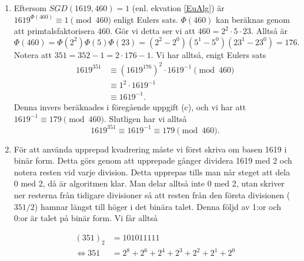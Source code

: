 \documentclass{article}
\begin{document}
\begin{enumerate}[label=(\alph*)]
	\item
	Eftersom $SGD(1619, 460) = 1$ (enl. ekvation \ref{EuAlg}) är $1619^{\Phi(460)} \equiv 1 \pmod{460}$ enligt Eulers sats. $\Phi(460)$ kan beräknas genom att primtalsfaktorisera 460. Gör vi detta ser vi att $460 = 2^2 \cdot 5 \cdot 23$. Alltså är
	\[
		\Phi(460) = \Phi(2^2) \Phi(5) \Phi(23) = (2^{2} - 2^{0}) (5^{1} - 5^{0}) (23^{1} - 23^{0}) = 176 
	.\] 
	Notera att $351 = 352 - 1 = 2 \cdot 176 - 1$. Vi har alltså, enigt Eulers sats
	\begin{equation*}
		\begin{aligned}
		1619^{351} &\equiv \left( 1619^{176} \right)^{2} \cdot 1619^{-1} \pmod{460}\\
					      &\equiv 1^{2} \cdot 1619^{-1}\\
					      &\equiv 1619^{-1}.
		\end{aligned}
	\end{equation*}
	Denna invers beräknades i föregående uppgift (c), och vi har att $1619^{-1} \equiv 179 \pmod{460}$. Slutligen har vi alltså
	\[
		1619^{351} \equiv 1619^{-1} \equiv 179 \pmod{460}
	.\] 

	\item
		För att använda upprepad kvadrering måste vi först skriva om basen 1619 i binär form. Detta görs genom att upprepade gånger dividera 1619 med 2 och notera resten vid varje division. Detta upprepas tills man når steget att dela 0 med 2, då är algoritmen klar. Man delar alltså inte 0 med 2, utan skriver ner resterna från tidigare divisioner så att resten från den första divisionen ($351 / 2$) hamnar längst till höger i det binära talet. Denna följd av 1:or och 0:or är talet på binär form. Vi får alltså

		\begin{equation*}
			\begin{aligned}
				(351)_2 &= 101011111\\
				\iff 351 &= 2^{8} + 2^{6} + 2^{4} + 2^{3} + 2^{2} + 2^{1} + 2^{0}
			\end{aligned}
		\end{equation*}


\end{enumerate}
\end{document}
